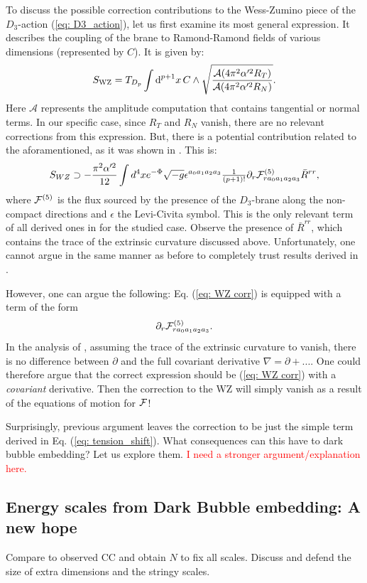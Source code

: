 To discuss the possible correction contributions to the Wess-Zumino piece of the $D_{3}$-action (\ref{eq: D3_action}), let us first examine its most general expression. It describes the coupling of the brane to Ramond-Ramond fields of various dimensions (represented by $C$). It is given by:
\begin{equation}
    S_{\rm WZ}= T_{D_p} \int \text{d}^{p+1} x \, C \wedge\sqrt{\frac{{\cal A}(4\pi^2 \alpha  '^{2} R_T)}{{\cal A}(4\pi^2 \alpha'^{2} R_N)}}.
\end{equation}
Here $\mathcal{A}$ represents the amplitude computation that contains tangential or normal terms. In our specific case, since $R_T$ and $R_N$ vanish, there are no relevant corrections from this expression. But, there is a potential contribution related to the aforamentioned, as it was shown in \cite{Jalali:2016aa}. This is:
\begin{equation} \label{eq: WZ corr}
    S_{WZ} \supset -\frac{\pi^2 \alpha'^{2}}{12} \int d^4 x e^{-\Phi} \sqrt{-g}\epsilon^{a_0 a_1 a_2 a_3}
    \tfrac{1}{(p+1)!}\partial _r {\cal F}^{(5)}_{r a_0 a_1 a_2 a_3} \bar{R}^{rr},
\end{equation}
where ${\cal F}^{(5)}$ is the flux sourced by the presence of the $D_{3}$-brane along the non-compact directions and $\epsilon$ the Levi-Civita symbol. This is the only relevant term of all derived ones in \cite{Jalali:2016aa} for the studied case. Observe the presence of $\bar{R}^{rr}$, which contains the trace of the extrinsic curvature discussed above. Unfortunately, one cannot argue in the same manner as before to completely trust results derived in \cite{Jalali:2016aa}.


However, one can argue the following: Eq. (\ref{eq: WZ corr}) is equipped with a term of the form
\begin{equation}
    \partial _r {\cal F}^{(5)}_{r a_0 a_1 a_2 a_3}.
\end{equation}
In the analysis of \cite{Jalali:2016aa}, assuming the trace of the extrinsic curvature to vanish, there is no difference between $\partial$ and the full covariant derivative $\nabla =\partial +...$. One could therefore argue that the correct expression should be (\ref{eq: WZ corr}) with a {\it covariant} derivative. Then the correction to the WZ will simply vanish as a result of the equations of motion for ${\cal F}$!

Surprisingly, previous argument leaves the correction to be just the simple term derived in Eq. (\ref{eq: tension_shift}). What consequences can this have to dark bubble embedding? Let us explore them.
\textcolor{red}{I need a stronger argument/explanation here.}


\subsection{Energy scales from Dark Bubble embedding: A new hope}\label{subsec: energy_scale}
Compare to observed CC and obtain $N$ to fix all scales. Discuss and defend the size of extra dimensions and the stringy scales.